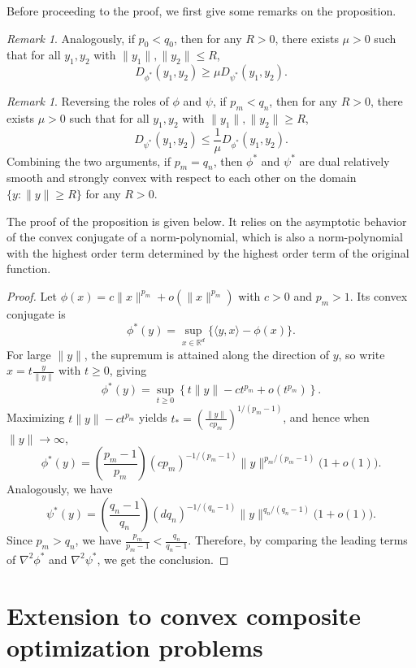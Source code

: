 \documentclass{article}
\theoremstyle{plain}
\theoremstyle{definition}
\theoremstyle{remark}
\newtheorem{remark}[theorem]{Remark}
\begin{document}
Before proceeding to the proof, we first give some remarks on the proposition.
\begin{remark}
   Analogously, if $p_0 < q_0$, then for any $R>0$, there exists $\mu>0$ such that for all $y_1,y_2$ with $\|y_1\|,\|y_2\| \le R$,
   $$D_{\phi^*}(y_1, y_2) \geq \mu D_{\psi^*}(y_1, y_2).$$
\end{remark}
\begin{remark}
   Reversing the roles of $\phi$ and $\psi$, if $p_m < q_n$, then for any $R>0$, there exists $\mu>0$ such that for all $y_1,y_2$ with $\|y_1\|,\|y_2\| \ge R$,
   $$D_{\psi^*}(y_1, y_2) \leq \frac{1}{\mu} D_{\phi^*}(y_1, y_2).$$ Combining the two arguments, if $p_m=q_n$, then $\phi^*$ and $\psi^*$ are dual relatively smooth and strongly convex with respect to each other on the domain $\{y:\|y\| \ge R\}$ for any $R>0$.
\end{remark}

The proof of the proposition is given below. It relies on the asymptotic behavior of the convex conjugate of a norm-polynomial, which is also a norm-polynomial with the highest order term determined by the highest order term of the original function.
\begin{proof}
Let $\phi(x) = c \|x\|^{p_m} + o(\|x\|^{p_m})$ with $c>0$ and $p_m>1$. Its convex conjugate is
\[
\phi^*(y) = \sup_{x \in \mathbb{R}^d} \big\{ \langle y, x \rangle - \phi(x) \big\}.
\]
For large $\|y\|$, the supremum is attained along the direction of $y$, so write $x = t \frac{y}{\|y\|}$ with $t \ge 0$, giving
\[
\phi^*(y) = \sup_{t \ge 0} \left\{ t \|y\| - c t^{p_m} + o(t^{p_m}) \right\}.
\]
Maximizing $t \|y\| - c t^{p_m}$ yields $t_* = \left( \frac{\|y\|}{c p_m} \right)^{1/(p_m-1)}$, and hence when $\|y\| \to \infty$,
\[
\phi^*(y) = \left( \frac{p_m-1}{p_m} \right) (c p_m)^{-1/(p_m-1)} \|y\|^{p_m/(p_m-1)} \big( 1 + o(1) \big).
\]
Analogously, we have \[
\psi^*(y) = \left( \frac{q_n-1}{q_n} \right) (d q_n)^{-1/(q_n-1)} \|y\|^{q_n/(q_n-1)} \big( 1 + o(1) \big).
\]
Since $p_m > q_n$, we have $\frac{p_m}{p_m-1} < \frac{q_n}{q_n-1}$. Therefore, by comparing the leading terms of $\nabla^2 \phi^*$ and $\nabla^2 \psi^*$, we get the conclusion.
\end{proof}

\section{Extension to convex composite optimization problems}
\label{sec:composite}
\end{document}
